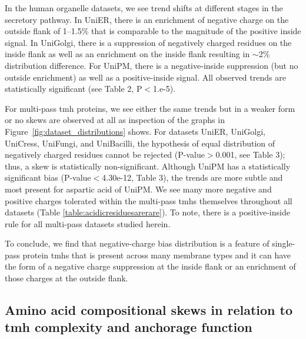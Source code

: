 In the human organelle datasets, we see trend shifts at different stages in the secretory pathway. In UniER, there is an enrichment of negative charge on the outside flank of 1--1.5\% that is comparable to the magnitude of the positive inside signal. In UniGolgi, there is a suppression of negatively charged residues on the inside flank as well as an enrichment on the inside flank resulting in \(\sim\)2\% distribution difference. For UniPM, there is a negative-inside suppression (but no outside enrichment) as well as a positive-inside signal. All observed trends are statistically significant (see Table 2, P$<$1.e-5).

For multi-pass \gls{tmh} proteins, we see either the same trends but in a weaker form or no skews are observed at all as inspection of the graphs in Figure~\ref{fig:dataset_distributions} shows. For datasets UniER, UniGolgi, UniCress, UniFungi, and UniBacilli, the hypothesis of equal distribution of negatively charged residues cannot be rejected (P-value$>$0.001, see Table 3); thus, a skew is statistically non-significant. Although UniPM has a statistically significant bias (P-value$<$4.30e-12, Table 3), the trends are more subtle and most present for aspartic acid of UniPM\@. We see many more negative and positive charges tolerated within the multi-pass \gls{tmh}s themselves throughout all datasets (Table \ref{table:acidicresiduesarerare}). To note, there is a positive-inside rule for all multi-pass datasets studied herein.

To conclude, we find that negative-charge bias distribution is a feature of single-pass protein \gls{tmh}s that is present across many membrane types and it can have the form of a negative charge suppression at the inside flank or an enrichment of those charges at the outside flank.

\subsection{Amino acid compositional skews in relation to \gls{tmh} complexity and anchorage function}

